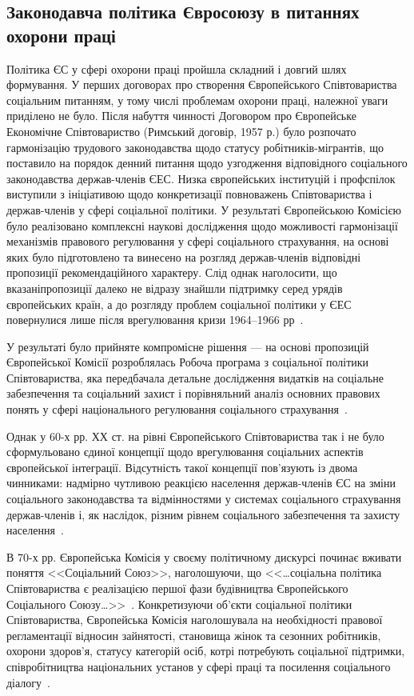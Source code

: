 \subsection{Законодавча політика Євросоюзу в питаннях охорони праці}
Політика ЄС у сфері охорони праці пройшла складний і довгий шлях формування.
У перших договорах про створення Європейського Співтовариства соціальним питанням, у тому числі проблемам охорони праці, належної уваги приділено не було. 
Після набуття чинності Договором про Європейське Економічне Співтовариство (Римський договір, 1957 р.) було розпочато гармонізацію трудового законодавства щодо статусу робітників-мігрантів, що поставило на порядок денний питання щодо узгодження відповідного соціального законодавства держав-членів ЄЕС. 
Низка європейських інституцій і профспілок виступили з ініціативою щодо конкретизації повноважень Співтовариства і держав-членів у сфері соціальної політики. У результаті Європейською Комісією було реалізовано комплексні наукові дослідження щодо можливості гармонізації механізмів правового регулювання у сфері соціального страхування, на основі яких було підготовлено та винесено на розгляд держав-членів відповідні пропозиції рекомендаційного характеру. 
Слід однак наголосити, що вказаніпропозиції далеко не відразу знайшли підтримку серед урядів європейських країн, а до розгляду проблем соціальної політики у ЄЕС повернулися лише після врегулювання кризи 1964–1966 рр~\cite{Shashula2015}.

У результаті було прийняте компромісне рішення --- на основі пропозицій Європейської Комісії розроблялась Робоча програма з соціальної політики  Співтовариства, яка передбачала детальне дослідження видатків на соціальне забезпечення та соціальний захист і порівняльний аналіз основних правових понять у сфері національного регулювання соціального страхування~\cite{Shashula2015}.

Однак у 60-х рр. ХХ ст. на рівні Європейського Співтовариства так і не було сформульовано єдиної концепції щодо врегулювання соціальних аспектів європейської інтеграції. Відсутність такої концепції пов’язують із двома чинниками: надмірно чутливою реакцією населення держав-членів ЄС на зміни соціального законодавства та відмінностями у системах соціального страхування держав-членів і, як наслідок, різним рівнем соціального забезпечення та захисту населення~\cite{Shashula2015}.

В 70-х рр. Європейська Комісія у своєму політичному дискурсі починає вживати поняття <<Соціальний Союз>>, наголошуючи, що <<…соціальна політика Співтовариства є реалізацією першої фази будівництва Європейського Соціального Союзу…>>~\cite{EuCouncil}. 
Конкретизуючи об’єкти соціальної політики Співтовариства, Європейська Комісія наголошувала на необхідності правової регламентації відносин зайнятості, становища жінок та сезонних робітників, охорони здоров’я, статусу категорій осіб, котрі потребують соціальної підтримки, співробітництва національних установ у сфері праці та посилення соціального діалогу~\cite{Shashula2015}. 

